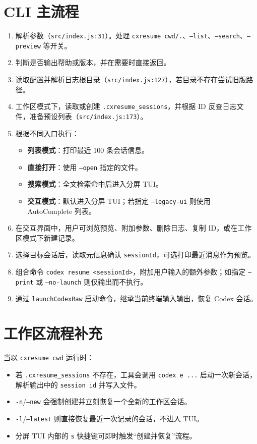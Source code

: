 \documentclass[12pt]{article}
\begin{document}
\section{CLI 主流程}
\begin{enumerate}[label=\arabic*.]
  \item 解析参数（\texttt{src/index.js:31}）。处理 \texttt{cxresume cwd/.}、\texttt{--list}、\texttt{--search}、\texttt{--preview} 等开关。
  \item 判断是否输出帮助或版本，并在需要时直接返回。
  \item 读取配置并解析日志根目录（\texttt{src/index.js:127}），若目录不存在尝试旧版路径。
  \item 工作区模式下，读取或创建 \texttt{.cxresume\_sessions}，并根据 ID 反查日志文件，准备预设列表（\texttt{src/index.js:173}）。
  \item 根据不同入口执行：
  \begin{itemize}[leftmargin=2em]
    \item \textbf{列表模式}：打印最近 100 条会话信息。
    \item \textbf{直接打开}：使用 \texttt{--open} 指定的文件。
    \item \textbf{搜索模式}：全文检索命中后进入分屏 TUI。
    \item \textbf{交互模式}：默认进入分屏 TUI；若指定 \texttt{--legacy-ui} 则使用 AutoComplete 列表。
  \end{itemize}
  \item 在交互界面中，用户可浏览预览、附加参数、删除日志、复制 ID，或在工作区模式下新建记录。
  \item 选择目标会话后，读取元信息确认 \texttt{sessionId}，可选打印最近消息作为预览。
  \item 组合命令 \texttt{codex resume <sessionId>}，附加用户输入的额外参数；如指定 \texttt{--print} 或 \texttt{--no-launch} 则仅输出而不执行。
  \item 通过 \texttt{launchCodexRaw} 启动命令，继承当前终端输入输出，恢复 Codex 会话。
\end{enumerate}

\section{工作区流程补充}
当以 \texttt{cxresume cwd} 运行时：
\begin{itemize}[leftmargin=2em]
  \item 若 \texttt{.cxresume\_sessions} 不存在，工具会调用 \texttt{codex e ...} 启动一次新会话，解析输出中的 \texttt{session id} 并写入文件。
  \item \texttt{-n}/\texttt{--new} 会强制创建并立刻恢复一个全新的工作区会话。
  \item \texttt{-l}/\texttt{--latest} 则直接恢复最近一次记录的会话，不进入 TUI。
  \item 分屏 TUI 内部的 \texttt{s} 快捷键可即时触发“创建并恢复”流程。
\end{itemize}
\end{document}
